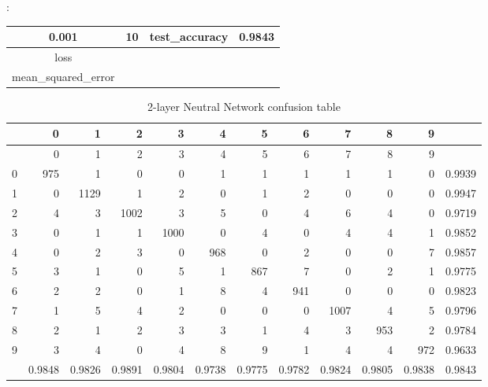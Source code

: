\documentclass[8pt]{beamer}
\begin{document}
\begin{frame}[allowframebreaks]{\secname : \subsecname}
\begin{table}[htbp]
\begin{tabular}{|c|c|c|c|}
 0.001 &   10 & test\_accuracy & 0.9843 \\ 
    \hline
 loss&&&\\
 mean\_squared\_error&&&\\
   \hline
\end{tabular}
\label{2-layer Neutral Network best hyper-parameter(ReLU)}	
\end{table}
\begin{table}[htbp]
\tiny
  \centering
  \caption{2-layer Neutral Network confusion table}
\begin{tabular}{|r|rrrrrrrrrr|r|}
\hline
  & 0 & 1 & 2 & 3 & 4 & 5 & 6 & 7 & 8 & 9 &  \\
\hline
  & 0 & 1 & 2 & 3 & 4 & 5 & 6 & 7 & 8 & 9 &  \\
0 & 975 & 1 & 0 & 0 & 1 & 1 & 1 & 1 & 1 & 0 & 0.9939 \\
1 & 0 & 1129 & 1 & 2 & 0 & 1 & 2 & 0 & 0 & 0 & 0.9947 \\
2 & 4 & 3 & 1002 & 3 & 5 & 0 & 4 & 6 & 4 & 0 & 0.9719 \\
3 & 0 & 1 & 1 & 1000 & 0 & 4 & 0 & 4 & 4 & 1 & 0.9852 \\
4 & 0 & 2 & 3 & 0 & 968 & 0 & 2 & 0 & 0 & 7 & 0.9857 \\
5 & 3 & 1 & 0 & 5 & 1 & 867 & 7 & 0 & 2 & 1 & 0.9775 \\
6 & 2 & 2 & 0 & 1 & 8 & 4 & 941 & 0 & 0 & 0 & 0.9823 \\
7 & 1 & 5 & 4 & 2 & 0 & 0 & 0 & 1007 & 4 & 5 & 0.9796 \\
8 & 2 & 1 & 2 & 3 & 3 & 1 & 4 & 3 & 953 & 2 & 0.9784 \\
9 & 3 & 4 & 0 & 4 & 8 & 9 & 1 & 4 & 4 & 972 & 0.9633 \\
\hline
  & 0.9848 & 0.9826 & 0.9891 & 0.9804 & 0.9738 & 0.9775 & 0.9782 & 0.9824 & 0.9805 & 0.9838 & 0.9843 \\
\hline
\end{tabular}%
  \label{2-layer Neutral Network confusion table}%
\end{table}%

\end{frame}
\end{document}

